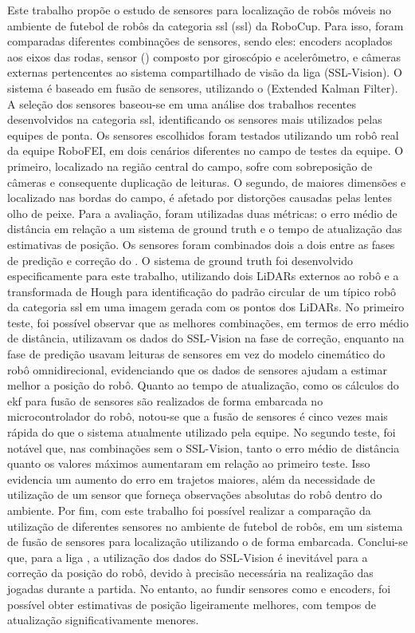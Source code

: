 \documentclass[acronym, symbols, table]{fei}
\begin{document}
\begin{resumo}
Este trabalho propõe o estudo de sensores para localização de robôs móveis no ambiente de futebol de robôs da categoria \acrlong{ssl} (\acrshort{ssl}) da RoboCup. Para isso, foram comparadas diferentes combinações de sensores, sendo eles: encoders acoplados aos eixos das rodas, sensor  () composto por giroscópio e acelerômetro, e câmeras externas pertencentes ao sistema compartilhado de visão da liga (SSL-Vision). O sistema é baseado em fusão de sensores, utilizando o  (Extended Kalman Filter). A seleção dos sensores baseou-se em uma análise dos trabalhos recentes desenvolvidos na categoria \acrshort{ssl}, identificando os sensores mais utilizados pelas equipes de ponta. Os sensores escolhidos foram testados utilizando um robô real da equipe RoboFEI, em dois cenários diferentes no campo de testes da equipe. O primeiro, localizado na região central do campo, sofre com sobreposição de câmeras e consequente duplicação de leituras. O segundo, de maiores dimensões e localizado nas bordas do campo, é afetado por distorções causadas pelas lentes olho de peixe. Para a avaliação, foram utilizadas duas métricas: o erro médio de distância em relação a um sistema de ground truth e o tempo de atualização das estimativas de posição. Os sensores foram combinados dois a dois entre as fases de predição e correção do . O sistema de ground truth foi desenvolvido especificamente para este trabalho, utilizando dois LiDARs externos ao robô e a transformada de Hough para identificação do padrão circular de um típico robô da categoria \acrshort{ssl} em uma imagem gerada com os pontos dos LiDARs. No primeiro teste, foi possível observar que as melhores combinações, em termos de erro médio de distância, utilizavam os dados do SSL-Vision na fase de correção, enquanto na fase de predição usavam leituras de sensores em vez do modelo cinemático do robô omnidirecional, evidenciando que os dados de sensores ajudam a estimar melhor a posição do robô. Quanto ao tempo de atualização, como os cálculos do \acrshort{ekf} para fusão de sensores são realizados de forma embarcada no microcontrolador do robô, notou-se que a fusão de sensores é cinco vezes mais rápida do que o sistema atualmente utilizado pela equipe. No segundo teste, foi notável que, nas combinações sem o SSL-Vision, tanto o erro médio de distância quanto os valores máximos aumentaram em relação ao primeiro teste. Isso evidencia um aumento do erro em trajetos maiores, além da necessidade de utilização de um sensor que forneça observações absolutas do robô dentro do ambiente. Por fim, com este trabalho foi possível realizar a comparação da utilização de diferentes sensores no ambiente de futebol de robôs, em um sistema de fusão de sensores para localização utilizando o  de forma embarcada. Conclui-se que, para a liga , a utilização dos dados do SSL-Vision é inevitável para a correção da posição do robô, devido à precisão necessária na realização das jogadas durante a partida. No entanto, ao fundir sensores como  e encoders, foi possível obter estimativas de posição ligeiramente melhores, com tempos de atualização significativamente menores.
	

\end{resumo}
\end{document}

